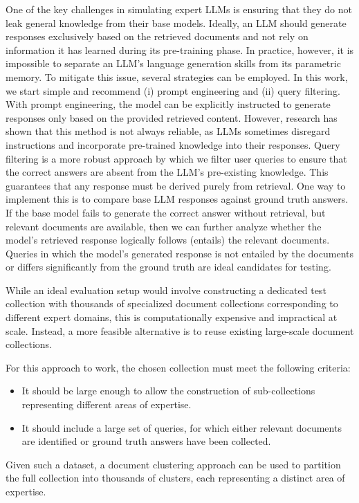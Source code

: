 One of the key challenges in simulating expert LLMs is ensuring that they do not leak general knowledge from their base models. Ideally, an LLM should generate responses exclusively based on the retrieved documents and not rely on information it has learned during its pre-training phase. In practice, however, it is impossible to separate an LLM's language generation skills from its parametric memory.
%
To mitigate this issue, several strategies can be employed. In this work, we start simple and recommend (i) prompt engineering and (ii) query filtering. With prompt engineering, the model can be explicitly instructed to generate responses only based on the provided retrieved content. However, research has shown that this method is not always reliable, as LLMs sometimes disregard instructions and incorporate pre-trained knowledge into their responses. Query filtering is a more robust approach by which we filter user queries to ensure that the correct answers are absent from the LLM's pre-existing knowledge. This guarantees that any response must be derived purely from retrieval. One way to implement this is to compare base LLM responses against ground truth answers. If the base model fails to generate the correct answer without retrieval, but relevant documents are available, then we can further analyze whether the model's retrieved response logically follows (entails) the relevant documents. Queries in which the model's generated response is not entailed by the documents or differs significantly from the ground truth are ideal candidates for testing.

While an ideal evaluation setup would involve constructing a dedicated test collection with thousands of specialized document collections corresponding to different expert domains, this is computationally expensive and impractical at scale. Instead, a more feasible alternative is to reuse existing large-scale document collections.

For this approach to work, the chosen collection must meet the following criteria:
\begin{itemize}
    \item It should be large enough to allow the construction of sub-collections representing different areas of expertise.
    \item It should include a large set of queries, for which either relevant documents are identified or ground truth answers have been collected.
\end{itemize}
Given such a dataset, a document clustering approach can be used to partition the full collection into thousands of clusters, each representing a distinct area of expertise.


